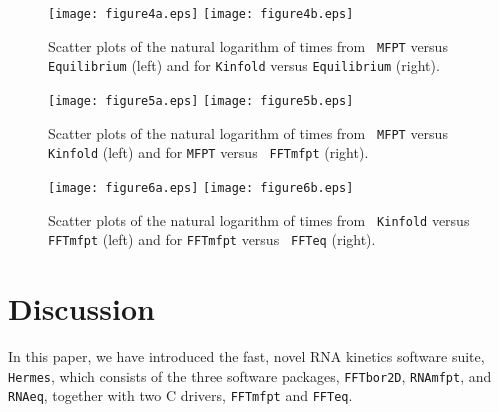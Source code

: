 \begin{figure}
\centering
\texttt{[image: figure4a.eps]}
\texttt{[image: figure4b.eps]}
\caption{ Scatter plots of the natural logarithm of times from {\tt
MFPT} versus {\tt Equilibrium} (left) and for {\tt Kinfold} versus
{\tt Equilibrium} (right). }
\label{fig:scatterplot_single_bp_moves_for_kinfold_vs_rnaeq}
\end{figure}


\begin{figure}
\centering
\texttt{[image: figure5a.eps]}
\texttt{[image: figure5b.eps]}
\caption{ Scatter plots of the natural logarithm of times from {\tt
MFPT} versus {\tt Kinfold} (left) and for {\tt MFPT} versus {\tt
FFTmfpt} (right). }
\label{fig:scatterplot_single_bp_moves_for_actual_mfpt_vs_fftbor2d}
\end{figure}


\begin{figure}
\centering
\texttt{[image: figure6a.eps]}
\texttt{[image: figure6b.eps]}
\caption{ Scatter plots of the natural logarithm of times from {\tt
Kinfold} versus {\tt FFTmfpt} (left) and for {\tt FFTmfpt} versus {\tt
FFTeq} (right). }
\label{fig:scatterplot_single_bp_moves_for_fftbor2d_vs_rnapopulation}
\end{figure}



\section{Discussion}
\label{section:discussion}

In this paper, we have introduced
the fast, novel RNA kinetics software suite, {\tt
Hermes}, which consists of the three software packages, {\tt FFTbor2D},
{\tt RNAmfpt}, and {\tt RNAeq},  together with two C drivers,
{\tt FFTmfpt} and {\tt FFTeq}.

